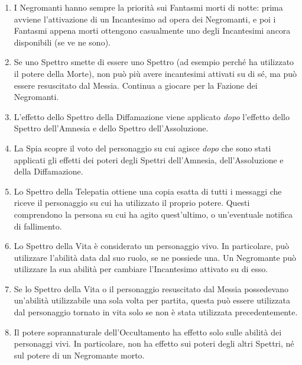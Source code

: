 \documentclass[a4paper,10pt]{article}
\begin{document}
\begin{enumerate}
	\item I Negromanti hanno sempre la priorità sui Fantasmi morti di notte: prima avviene l'attivazione di un Incantesimo ad opera dei Negromanti, e poi i Fantasmi appena morti ottengono casualmente uno degli Incantesimi ancora disponibili (se ve ne sono).

	\item Se uno Spettro smette di essere uno Spettro (ad esempio perché ha utilizzato il potere della Morte), non può più avere incantesimi attivati su di sé, ma può essere resuscitato dal Messia. Continua a giocare per la Fazione dei Negromanti.
	
	\item L'effetto dello Spettro della Diffamazione viene applicato \emph{dopo} l'effetto dello Spettro dell'Amnesia e dello Spettro dell'Assoluzione.
	
	\item La Spia scopre il voto del personaggio su cui agisce \emph{dopo} che sono stati applicati gli effetti dei poteri degli Spettri dell'Amnesia, dell'Assoluzione e della Diffamazione.
	
	\item Lo Spettro della Telepatia ottiene una copia esatta di tutti i messaggi che riceve il personaggio su cui ha utilizzato il proprio potere. Questi comprendono la persona su cui ha agito quest'ultimo, o un'eventuale notifica di fallimento.
	
	\item Lo Spettro della Vita è considerato un personaggio vivo. In particolare, può utilizzare l'abilità data dal suo ruolo, se ne possiede una. Un Negromante può utilizzare la sua abilità per cambiare l'Incantesimo attivato su di esso.
	
	\item Se lo Spettro della Vita o il personaggio resuscitato dal Messia possedevano un'abilità utilizzabile una sola volta per partita, questa può essere utilizzata dal personaggio tornato in vita solo se non è stata utilizzata precedentemente.
	
	\item Il potere soprannaturale dell'Occultamento ha effetto solo sulle abilità dei personaggi vivi. In particolare, non ha effetto sui poteri degli altri Spettri, né sul potere di un Negromante morto.
	

\end{enumerate}
\end{document}
